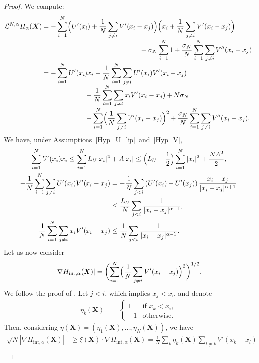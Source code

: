 \documentclass[10pt]{amsart}
\newcommand{\bX}{{\boldsymbol{X}}}
\newcommand{\rint}{\mathrm{int}}
\theoremstyle{plain}
\theoremstyle{definition}
\begin{document}
\begin{proof}
We compute:
\begin{align*}
\mathcal{L}^{N,\alpha} H_{\alpha}(\bX)
&=-\sum_{i=1}^N\Bigl(U'(x_i)+\frac{1}{N}\sum_{j\neq i}V'(x_i-x_j)\Bigr)\Bigl(x_i+\frac{1}{N}\sum_{j\neq i}V'(x_i-x_j)\Bigr)\\[-3pt]
&\hspace*{5cm}+\sigma_N\sum_{i=1}^N1+\frac{\sigma_N}{N}\sum_{i=1}^N\sum_{j\neq i}V''(x_i-x_j)\\[-3pt]
&=-\sum_{i=1}^N U'(x_i)x_i-\frac{1}{N}\sum_{i=1}^N\sum_{j\neq i}U'(x_i)V'(x_i-x_j)\\[-5pt]
&\hspace*{2.2cm}-\frac{1}{N}\sum_{i=1}^N\sum_{j\neq i}x_iV'(x_i-x_j)+N\sigma_N\\[-3pt]
&\hspace*{2.2cm}-\sum_{i=1}^N\Bigl(\frac{1}{N}\sum_{j\neq i}V'(x_i-x_j)\Bigr)^2+\frac{\sigma_N}{N}\sum_{i=1}^N\sum_{j\neq i}V''(x_i-x_j).
\end{align*}
We have, under Assumptions~\ref{Hyp_U_lip}~and~\ref{Hyp_V},
\begin{align}
-\sum_{i=1}^N U'(x_i)x_i\leq\sum_{i=1}^NL_U|x_i|^2&+A|x_i|\leq\Bigl(L_U+\frac{1}{2}\Bigr)\sum_{i=1}^N|x_i|^2+\frac{NA^2}{2},\label{ineq_lya_U}\\
-\frac{1}{N}\sum_{i=1}^N\sum_{j\neq i}U'(x_i)V'(x_i-x_j)&=-\frac{1}{N}\sum_{j< i}\left(U'(x_i)-U'(x_j)\right)\frac{x_i-x_j}{|x_i-x_j|^{\alpha+1}}\label{ineq_lya_V}\\
&\leq \frac{L_U}{N}\sum_{j< i}\frac{1}{|x_i-x_j|^{\alpha-1}},\notag\\
-\frac{1}{N}\sum_{i=1}^N\sum_{j\neq i}x_iV'(x_i-x_j)&\leq \frac{1}{N}\sum_{j< i}\frac{1}{|x_i-x_j|^{\alpha-1}}\label{ineq_lya_V_2}.
\end{align}
Let us now consider
\[
\left|\nabla H_{\rint, \alpha}(\bX)\right|=\biggl(\sum_{i=1}^N\Bigl(\frac{1}{N}\sum_{j\neq i}V'(x_i-x_j)\Bigr)^2\biggr)^{1/2}.
\]
We follow the proof of \cite[Lem.\,5.15]{herzog_mattingly}. Let $j<i$, which implies $x_j<x_i$, and denote
\begin{align*}
\eta_k\left(\bX\right)&=\begin{cases}
1&\text{if }x_k<x_i,\\
-1 &\text{otherwise.}\end{cases}
\end{align*}
Then, considering $\eta(\bX)=\left(\eta_1(\bX),\dots,\eta_N(\bX)\right)$, we have
\begin{align*}
\sqrt{N}\left|\nabla H_{\rint, \alpha}(\bX)\right|&\geq \xi(\bX)\cdot\nabla H_{\rint,\alpha}(\bX)=\frac{1}{N}\sum_k\eta_k(\bX)\sum_{l\neq k}V'(x_k-x_l)\\

\end{align*}
\end{proof}
\end{document}
